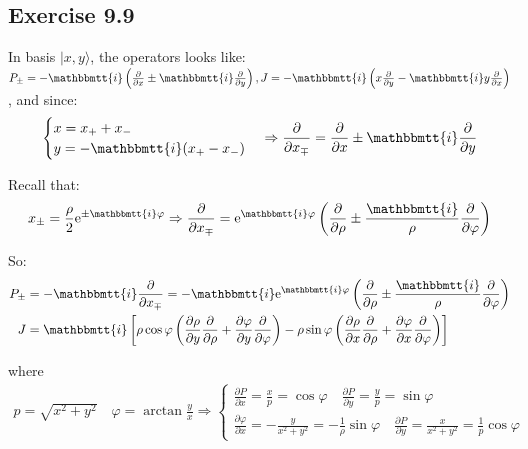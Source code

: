 \documentclass[]{ctexart}
\newcommand{\mi}{\mathbbmtt{i}}
\newcommand{\pa}{\partial}
\newcommand{\me}{\mathrm{e}}
\begin{document}
\subsection{Exercise 9.9}
	In basis $|x,y\rangle$, the operators looks like: $P_{\pm}=-\mi \left(\frac{\pa }{\pa x}\pm \mi \frac{\pa }{\pa y}\right),J=-\mi \left(x\frac{\pa }{\pa y}- \mi y\frac{\pa }{\pa x}\right)$, and since:	
		\begin{equation*}
		\begin{aligned}
			\begin{cases}
				x=x_++x_-\\
				y=-\mi (x_+-x_-)
			\end{cases}
			\Rightarrow \frac{\pa}{\pa x_{\mp}}=\frac{\pa}{\pa x}\pm \mi \frac{\pa}{\pa y}
		\end{aligned}
		\end{equation*}   
	
	Recall that: 
		\begin{equation*}
		\begin{aligned}
			x_{\pm }=\dfrac{\rho}{2}\me^{\pm \mi \varphi} \Rightarrow \frac{\pa }{\pa x_{\mp}}=\me ^{\mi \varphi}\left(\frac{\pa}{\pa \rho}\pm \frac{\mi}{\rho}\frac{\pa }{\pa \varphi}\right)
		\end{aligned}
		\end{equation*}
	
	So:
		\begin{equation*}
		\begin{aligned}
			P_{\pm}&=-\mi \frac{\pa }{\pa x_{\mp}}=-\mi \me^{\mi \varphi}\left(\frac{\pa}{\pa \rho}\pm \frac{\mi}{\rho}\frac{\pa }{\pa \varphi}\right)\\
			J&=\mi \left[\rho \cos \varphi\left(\frac{\pa \rho}{\pa y}\frac{\pa}{\pa \rho}+\frac{\pa \varphi}{\pa y}\frac{\pa}{\pa \varphi}\right)-\rho \sin \varphi\left(\frac{\pa \rho}{\pa x}\frac{\pa}{\pa \rho}+\frac{\pa \varphi}{\pa x}\frac{\pa}{\pa \varphi}\right)\right]
		\end{aligned}
		\end{equation*}
	
	where 
		\begin{equation*}
		\begin{aligned}
			p=\sqrt{x^{2}+y^{2}} \quad \varphi=\arctan \frac{y}{x} \Rightarrow\left\{\begin{array}{l}
			\frac{\partial P}{\partial x}=\frac{x}{p}=\cos \varphi \quad \frac{\partial P}{\partial y}=\frac{y}{p}=\sin \varphi \\
			\frac{\partial \varphi}{\partial x}=-\frac{y}{x^{2}+y^{2}}=-\frac{1}{\rho} \sin \varphi \quad \frac{\partial P}{\partial y}=\frac{x}{x^{2}+y^{2}}=\frac{1}{p} \cos \varphi
			\end{array}\right.
		\end{aligned}
		\end{equation*}
	
\end{document}
